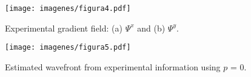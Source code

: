 \documentclass[12pt,letterpaper]{article}
\begin{document}
\begin{figure}[ht]
  \begin{center}
   \texttt{[image: imagenes/figura4.pdf]}
    \caption{Experimental gradient field: (a) $\Psi^{x}$ and (b) $\Psi^{y}$.}\label{fig:ExperimentalGradientes}
  \end{center}
\end{figure}

\begin{figure}[ht]
  \begin{center}
   \texttt{[image: imagenes/figura5.pdf]}
    \caption{Estimated wavefront from experimental information using $p$ = 0.}\label{fig:ExperimentalEstimado}
  \end{center}
\end{figure}
\end{document}
